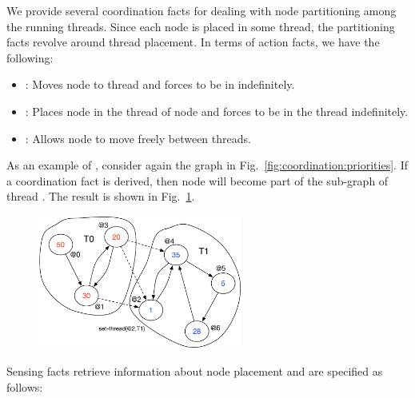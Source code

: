 We provide several coordination facts for dealing with node partitioning among
the running threads. Since each node is placed in some thread, the partitioning
facts revolve around thread placement.  In terms of action facts, we have the
following:

\begin{itemize}
   \item {}: Moves node  to thread
       and forces  to be in  indefinitely.

   \item {}: Places node  in the thread
      of node  and forces  to be in the thread indefinitely.

   \item {}: Allows node  to move freely
   between threads.

\end{itemize}

As an example of , consider again the graph in
Fig.~\ref{fig:coordination:priorities}. If a coordination fact
 is derived, then node  will become part
of the sub-graph of thread . The result is shown in
Fig.~\ref{fig:coordination:partitioning}.

\begin{figure}
\begin{center}
   \includegraphics[width=0.6\textwidth]{figures/coordination/partitioning.pdf}
\end{center}
\label{fig:coordination:partitioning}
\end{figure}

Sensing facts retrieve information about node placement and are specified as
follows:


